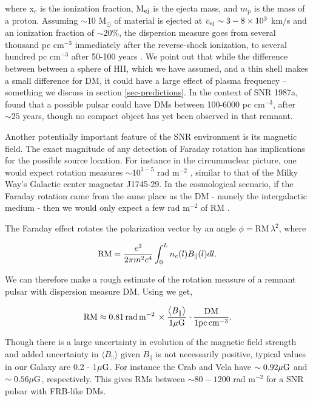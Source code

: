\documentclass[useAMS,usenatbib]{mn2e}
\begin{document}
\noindent where x$_e$ is the ionization fraction, 
M$_{\rm ej}$ is the ejecta mass, and $m_p$ 
is the mass of a proton. Assuming $\sim$10 M$_{\odot}$ of material 
is ejected at $v_{\rm ej}\sim 3-8\times10^3$ km/s and an ionization fraction of 
$\sim20\% $, the dispersion measure goes from several 
thousand pc cm$^{-3}$ immediately
after the reverse-shock ionization, to several hundred pc cm$^{-3}$ after 50-100 years 
\cite{2014ApJ...796...82Z}. We point out that while the difference between between 
a sphere of HII, which we have assumed, and a thin shell makes a small difference
for DM, it could have a large effect of plasma frequency -- something we discuss
in section \ref{sec-predictions}.
In the context of SNR 1987a, \cite{2014ApJ...796...82Z} found that a possible pulsar 
could have DMs between 100-6000 pc cm$^{-3}$, after $\sim 25$ years, though 
no compact object has yet been observed in that remnant.

Another potentially important feature of the SNR environment is its magnetic
field. 
The exact magnitude of any detection of Faraday rotation has implications for the possible source location. For
instance in the circumnuclear picture, one would expect rotation measures 
$\sim10^{3-5}$ rad m$^{-2}$ \citep{2015arXiv150101341P}, similar to that of the Milky Way's
Galactic center magnetar J1745-29. In the cosmological scenario, if the Faraday 
rotation
came from the same place as the DM - namely the intergalactic medium -
then we would only expect a few rad m$^{-2}$ of RM \citep{2015A&A...575A.118O}. 

The Faraday effect rotates the polarization vector
by an angle $\phi = $RM$\, \lambda^2$, where

\begin{equation}
\textup{RM} = \frac{e^3}{2\pi m^2 c^4} \int_0^{L} n_e(l) B_\parallel (l) dl.
\end{equation}

We can therefore make a rough estimate of the rotation measure of a remnant 
pulsar with dispersion measure DM. Using 
\cite{2014ira..book.....B} we get,

\begin{equation}
\textup{RM} \approx 0.81\,\textup{rad}  \, \textup{m}^{-2} \, \times \frac{\left < B_{\parallel} \right >}
{1 \mu \rm G} \cdot \frac{\textup{DM}}{1 \textup{pc}\,\textup{cm}^{-3}} .
\end{equation}

Though there is a large uncertainty in evolution of the magnetic field strength and added
uncertainty in $\langle B_{\parallel} \rangle$ given $B_{\parallel}$ is not necessarily positive, 
typical values in our Galaxy are 0.2 - 1$\mu \rm G$. For instance the Crab and Vela have 
$ \sim 0.92 \mu \rm G$ and $\sim 0.56 \mu \rm G$, respectively. 
This gives RMs between $\sim 80-1200$
rad m$^{-2}$ for a SNR pulsar with FRB-like DMs.
\end{document}
